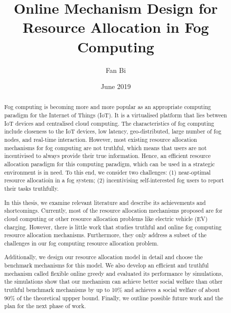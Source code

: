 \documentclass[11pt]{phdthesis}
\begin{document}
\frontmatter
\title      {Online Mechanism Design for Resource Allocation in Fog Computing}
\date       {June 2019}
\author     {Fan Bi}

\maketitle

\begin{abstract}
  Fog computing is becoming more and more popular as an appropriate computing paradigm for the Internet of Things (IoT). It is a virtualised platform that lies between IoT devices and centralised cloud computing. The characteristics of fog computing include closeness to the IoT devices, low latency, geo-distributed,  large number of fog nodes, and real-time interaction. However, most existing resource allocation mechanisms for fog computing are not truthful, which means that users are not incentivised to always provide their true information. Hence, an efficient resource allocation paradigm for this computing paradigm, which can be used in a strategic environment is in need. To this end, we consider two challenges: (1) near-optimal resource allocatioin in a fog system; (2) incentivising self-interested fog users to report their tasks truthfully. 

In this thesis, we examine relevant literature and describe its achievements and shortcomings. Currently, most of the resource allocation mechanisms proposed are for cloud computing or other resource allocation problems like electric vehicle (EV) charging. However, there is little work that studies truthful and online fog computing resource allocation mechanisms. Furthermore, they only address a subset of the challenges in our fog computing resource allocation problem. 

Additionally, we design our resource allocation model in detail and choose the benchmark mechanisms for this model. We also develop an efficient and truthful mechanism called flexible online greedy and evaluated its performance by simulations, the simulations show that our mechanism can achieve better social welfare than other truthful benchmark mechanisms by up to 10\% and achieves a social welfare of about 90\% of the theoretical uppper bound. Finally, we outline possible future work and the plan for the next phase of work.
\end{abstract}
\end{document}
